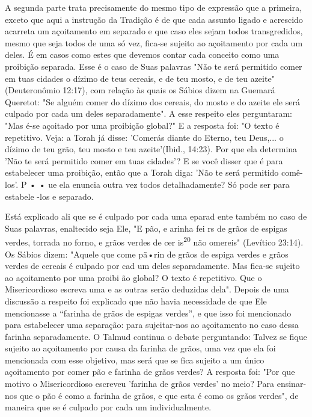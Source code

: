 A segunda parte trata precisamente do mesmo tipo de expressão que a
primeira, exceto que aqui a instrução da Tradição é de que cada assunto
liga­do e acrescido acarreta um açoitamento em separado e que caso eles
sejam to­dos transgredidos, mesmo que seja todos de uma só vez, fica-se
sujeito ao açoi­tamento por cada um deles. É em casos como estes que
devemos contar cada conceito como uma proibição separada.
Esse é o caso de Suas palavras "Não te será permitido comer em tuas
cidades o dízimo de teus cereais, e de teu mosto, e de teu azeite"
(Deuteronô­mio 12:17), com relação às quais os Sábios dizem na Guemará
Queretot: "Se al­guém comer do dízimo dos cereais, do mosto e do azeite
ele será culpado por cada um deles separadamente". A esse respeito eles
perguntaram: "Mas é-se açoi­tado por uma proibição global?" E a resposta
foi: "O texto é repetitivo. Veja: a Torah já disse: 'Comerás diante do
Eterno, teu Deus,... o dízimo de teu grão, teu mosto e teu
azeite'(Ibid., 14:23). Por que ela determina 'Não te será permiti­do
comer em tuas cidades'? E se você disser que é para estabelecer uma
proibi­ção, então que a Torah diga: 'Não te será permitido comê-los'. P
• • ue ela enun­cia outra vez todos detalhadamente? Só pode ser para
estabele -los e separado.

Está explicado ali que se é culpado por cada uma eparad ente tam­bém no
caso de Suas palavras, enaltecido seja Ele, "E pão, e arinha fei rs de
grãos de espigas verdes, torrada no forno, e grãos verdes de cer
is\textsuperscript{20} não omereis" (Levítico 23:14). Os Sábios dizem:
"Aquele que come pã•rin de grãos de espiga verdes e grãos verdes de
cereais é culpado por cad um deles separada­mente. Mas fica-se sujeito
ao açoitamento por uma proibi ão global? O texto é repetitivo. Que o
Misericordioso escreva uma e as outras serão deduzidas de­la". Depois de
uma discussão a respeito foi explicado que não havia necessida­de de que
Ele mencionasse a ``farinha de grãos de espigas verdes'', e que isso foi
mencionado para estabelecer uma separação: para sujeitar-nos ao
açoitamento no caso dessa farinha separadamente. O Talmud continua o
debate perguntan­do: Talvez se fique sujeito ao açoitamento por causa da
farinha de grãos, uma vez que ela foi mencionada com esse objetivo, mas
será que se fica sujeito a um único açoitamento por comer pão e farinha
de grãos verdes? A resposta foi: "Por que motivo o Misericordioso
escreveu 'farinha de grãos verdes' no meio? Para ensinar-nos que o pão é
como a farinha de grãos, e que esta é como os grãos verdes", de maneira
que se é culpado por cada um individualmente.

